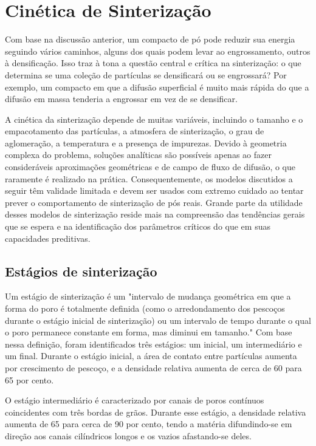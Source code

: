 \section*{Cinética de Sinterização}

Com base na discussão anterior, um compacto de pó pode reduzir sua energia seguindo vários caminhos, alguns dos quais podem levar ao engrossamento, outros à densificação. Isso traz à tona a questão central e crítica na sinterização: o que determina se uma coleção de partículas se densificará ou se engrossará? Por exemplo, um compacto em que a difusão superficial é muito mais rápida do que a difusão em massa tenderia a engrossar em vez de se densificar.

A cinética da sinterização depende de muitas variáveis, incluindo o tamanho e o empacotamento das partículas, a atmosfera de sinterização, o grau de aglomeração, a temperatura e a presença de impurezas. Devido à geometria complexa do problema, soluções analíticas são possíveis apenas ao fazer consideráveis aproximações geométricas e de campo de fluxo de difusão, o que raramente é realizado na prática. Consequentemente, os modelos discutidos a seguir têm validade limitada e devem ser usados com extremo cuidado ao tentar prever o comportamento de sinterização de pós reais. Grande parte da utilidade desses modelos de sinterização reside mais na compreensão das tendências gerais que se espera e na identificação dos parâmetros críticos do que em suas capacidades preditivas.

\subsection*{Estágios de sinterização}

Um estágio de sinterização é um "intervalo de mudança geométrica em que a forma do poro é totalmente definida (como o arredondamento dos pescoços durante o estágio inicial de sinterização) ou um intervalo de tempo durante o qual o poro permanece constante em forma, mas diminui em tamanho." Com base nessa definição, foram identificados três estágios: um inicial, um intermediário e um final. Durante o estágio inicial, a área de contato entre partículas aumenta por crescimento de pescoço, e a densidade relativa aumenta de cerca de 60 para 65 por cento.

O estágio intermediário é caracterizado por canais de poros contínuos coincidentes com três bordas de grãos. Durante esse estágio, a densidade relativa aumenta de 65 para cerca de 90 por cento, tendo a matéria difundindo-se em direção aos canais cilíndricos longos e os vazios afastando-se deles.

